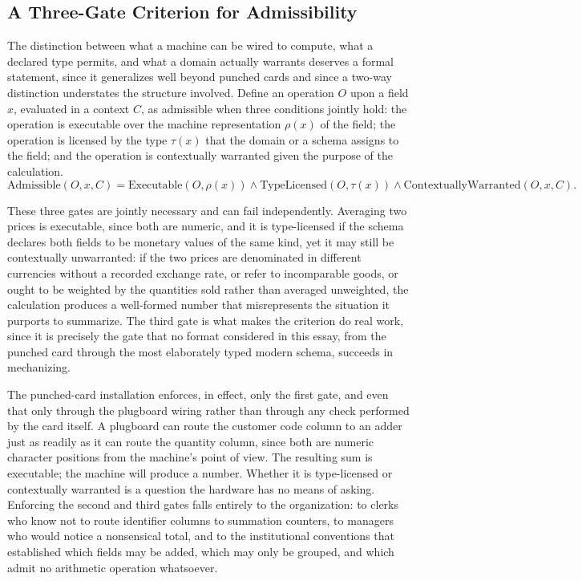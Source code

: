 \documentclass[11pt]{article}
\begin{document}
\subsection{A Three-Gate Criterion for Admissibility}

The distinction between what a machine can be wired to compute, what a declared type permits, and what a domain actually warrants deserves a formal statement, since it generalizes well beyond punched cards and since a two-way distinction understates the structure involved. Define an operation $O$ upon a field $x$, evaluated in a context $C$, as admissible when three conditions jointly hold: the operation is executable over the machine representation $\rho(x)$ of the field; the operation is licensed by the type $\tau(x)$ that the domain or a schema assigns to the field; and the operation is contextually warranted given the purpose of the calculation.
\[
\text{Admissible}(O, x, C) = \text{Executable}(O, \rho(x)) \land \text{TypeLicensed}(O, \tau(x)) \land \text{ContextuallyWarranted}(O, x, C).
\]

These three gates are jointly necessary and can fail independently. Averaging two prices is executable, since both are numeric, and it is type-licensed if the schema declares both fields to be monetary values of the same kind, yet it may still be contextually unwarranted: if the two prices are denominated in different currencies without a recorded exchange rate, or refer to incomparable goods, or ought to be weighted by the quantities sold rather than averaged unweighted, the calculation produces a well-formed number that misrepresents the situation it purports to summarize. The third gate is what makes the criterion do real work, since it is precisely the gate that no format considered in this essay, from the punched card through the most elaborately typed modern schema, succeeds in mechanizing.

The punched-card installation enforces, in effect, only the first gate, and even that only through the plugboard wiring rather than through any check performed by the card itself. A plugboard can route the customer code column to an adder just as readily as it can route the quantity column, since both are numeric character positions from the machine's point of view. The resulting sum is executable; the machine will produce a number. Whether it is type-licensed or contextually warranted is a question the hardware has no means of asking. Enforcing the second and third gates falls entirely to the organization: to clerks who know not to route identifier columns to summation counters, to managers who would notice a nonsensical total, and to the institutional conventions that established which fields may be added, which may only be grouped, and which admit no arithmetic operation whatsoever.
\end{document}
